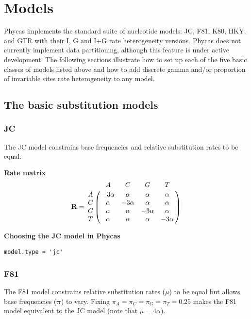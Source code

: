\documentclass[10pt]{article}
\begin{document}
\section{Models}\label{sec:models}

Phycas implements the standard suite of nucleotide models: JC, F81, K80, HKY, and GTR with their I, G and I+G rate heterogeneity versions. Phycas does not currently implement data partitioning, although this feature is under active development. The following sections illustrate how to set up each of the five basic classes of models listed above and how to add discrete gamma and/or proportion of invariable sites rate heterogeneity to any model.

\subsection{The basic substitution models}

\subsubsection{JC}
The JC model \citep{JukesCantor1969} constrains base frequencies and relative substitution rates to be equal.

{\bf Rate matrix}
$${\bf R} = \bordermatrix{ &     A     &     C     &     G     &   T       \cr
                         A & -3 \alpha &  \alpha   &  \alpha   &  \alpha   \cr
                         C &  \alpha   & -3 \alpha &  \alpha   &  \alpha   \cr
                         G &  \alpha   &  \alpha   & -3 \alpha &  \alpha   \cr
                         T &  \alpha   &  \alpha   &  \alpha   & -3 \alpha \cr}$$

{\bf Choosing the JC model in Phycas}
\begin{verbatim}
model.type = 'jc'
\end{verbatim}

\subsubsection{F81}

The F81 model \citep{Felsenstein1981} constrains relative substitution rates ($\mu$) to be equal but allows base frequencies ($\bm \pi$) to vary. Fixing $\pi_A = \pi_C = \pi_G = \pi_T = 0.25$ makes the F81 model equivalent to the JC model (note that $\mu = 4 \alpha$).
\end{document}
